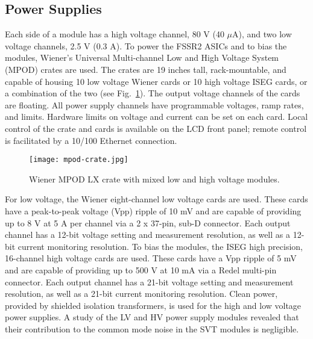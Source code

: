 \subsection{Power Supplies}

Each side of a module has a high voltage channel, 80 V (40 $\mu$A), and two low voltage channels, 2.5 V (0.3 A). To power the FSSR2 ASICs and to bias the modules, Wiener's Universal Multi-channel Low and High Voltage System (MPOD) crates are used. The crates are 19 inches tall, rack-mountable, and capable of housing 10 low voltage Wiener cards or 10 high voltage ISEG cards, or a combination of the two (see Fig.~\ref{fig:mpod-crate}). The output voltage channels of the cards are floating. All power supply channels have programmable voltages, ramp rates, and limits. Hardware limits on voltage and current can be set on each card. Local control of the crate and cards is available on the LCD front panel; remote control is facilitated by a 10/100 Ethernet connection. 

\begin{figure}[hbt] 
\centering 
\texttt{[image: mpod-crate.jpg]}
\caption{Wiener MPOD LX crate with mixed low and high voltage modules.}
\label{fig:mpod-crate}
\end{figure}

For low voltage, the Wiener eight-channel low voltage cards are used. These cards have a peak-to-peak voltage (Vpp) ripple of 10 mV and are capable of providing up to 8 V at 5 A per channel via a 2 x 37-pin, sub-D connector. Each output channel has a 12-bit voltage setting and measurement resolution, as well as a 12-bit current monitoring resolution. To bias the modules, the ISEG high precision, 16-channel high voltage cards are used. These cards have a Vpp ripple of 5 mV and are capable of providing up to 500 V at 10 mA via a Redel multi-pin connector. Each output channel has a 21-bit voltage setting and measurement resolution, as well as a 21-bit current monitoring resolution. Clean power, provided by shielded isolation transformers, is used for the high and low voltage power supplies. A study of the LV and HV power supply modules revealed that their contribution to the common mode noise in the SVT modules is negligible.

